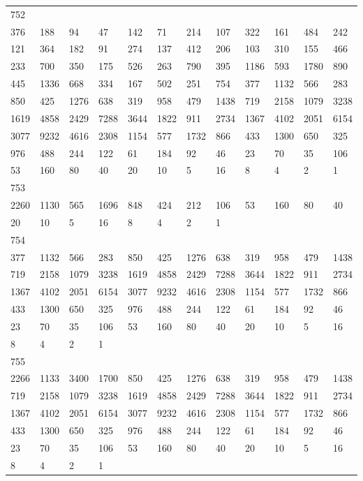 \begin{longtable}{llllllllllll}
752&&&&&&&&&&&\\
376& 188& 94& 47& 142& 71& 214& 107& 322& 161& 484& 242\\
121& 364& 182& 91& 274& 137& 412& 206& 103& 310& 155& 466\\
233& 700& 350& 175& 526& 263& 790& 395& 1186& 593& 1780& 890\\
445& 1336& 668& 334& 167& 502& 251& 754& 377& 1132& 566& 283\\
850& 425& 1276& 638& 319& 958& 479& 1438& 719& 2158& 1079& 3238\\
1619& 4858& 2429& 7288& 3644& 1822& 911& 2734& 1367& 4102& 2051& 6154\\
3077& 9232& 4616& 2308& 1154& 577& 1732& 866& 433& 1300& 650& 325\\
976& 488& 244& 122& 61& 184& 92& 46& 23& 70& 35& 106\\
53& 160& 80& 40& 20& 10& 5& 16& 8& 4& 2& 1\\

753&&&&&&&&&&&\\
2260& 1130& 565& 1696& 848& 424& 212& 106& 53& 160& 80& 40\\
20& 10& 5& 16& 8& 4& 2& 1& \\

754&&&&&&&&&&&\\
377& 1132& 566& 283& 850& 425& 1276& 638& 319& 958& 479& 1438\\
719& 2158& 1079& 3238& 1619& 4858& 2429& 7288& 3644& 1822& 911& 2734\\
1367& 4102& 2051& 6154& 3077& 9232& 4616& 2308& 1154& 577& 1732& 866\\
433& 1300& 650& 325& 976& 488& 244& 122& 61& 184& 92& 46\\
23& 70& 35& 106& 53& 160& 80& 40& 20& 10& 5& 16\\
8& 4& 2& 1& \\

755&&&&&&&&&&&\\
2266& 1133& 3400& 1700& 850& 425& 1276& 638& 319& 958& 479& 1438\\
719& 2158& 1079& 3238& 1619& 4858& 2429& 7288& 3644& 1822& 911& 2734\\
1367& 4102& 2051& 6154& 3077& 9232& 4616& 2308& 1154& 577& 1732& 866\\
433& 1300& 650& 325& 976& 488& 244& 122& 61& 184& 92& 46\\
23& 70& 35& 106& 53& 160& 80& 40& 20& 10& 5& 16\\
8& 4& 2& 1& \\


\end{longtable}
